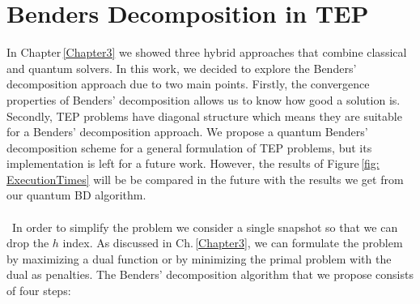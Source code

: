 \section{Benders Decomposition in TEP}
In Chapter\,\ref{Chapter3} we showed three hybrid approaches that combine classical and quantum solvers. In this work, we decided to explore the Benders' decomposition approach due to two main points. Firstly, the convergence properties of Benders' decomposition allows us to know how good a solution is. Secondly, TEP problems have diagonal structure which means they are suitable for a Benders' decomposition approach. We propose a quantum Benders' decomposition scheme for a general formulation of TEP problems, but its implementation is left for a future work. However, the results of Figure\,\ref{fig: ExecutionTimes} will be be compared in the future with the results we get from our quantum BD algorithm.\\\\\
In order to simplify the problem we consider a single snapshot so that we can drop the $h$ index. As discussed in Ch.\,\ref{Chapter3}, we can formulate the problem by maximizing a dual function or by minimizing the primal problem with the dual as penalties. The Benders' decomposition algorithm that we propose consists of four steps:
